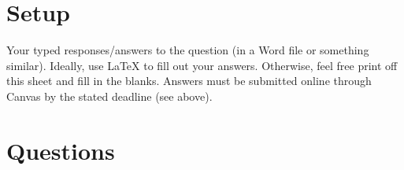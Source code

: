 \documentclass[12pt]{article}
\begin{document}
\singlespacing


\bigskip

\doublespacing



\section*{Setup}

\noindent Your typed responses/answers to the question (in a Word file or something similar).
Ideally, use LaTeX to fill out your answers. Otherwise, feel free print off this sheet and fill in the blanks.
Answers must be submitted online through Canvas by the stated deadline (see above).

\section*{Questions}
\end{document}
